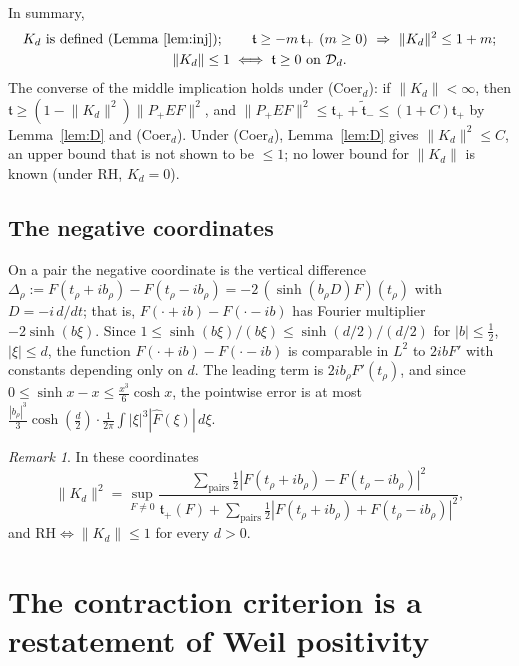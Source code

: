 \documentclass[11pt]{amsart}
\theoremstyle{definition}
\theoremstyle{remark}
\newtheorem{remark}[theorem]{Remark}
\newcommand{\half}{\tfrac12}
\newcommand{\tform}{\mathfrak t}
\newcommand{\tplus}{\mathfrak t_+}
\newcommand{\ttilde}{\widetilde{\mathfrak t}_-}
\newcommand{\Kop}{K}
\newcommand{\Norm}[1]{\lVert #1 \rVert}
\begin{document}
In summary,
\begin{equation}\label{eq:dict}
\begin{gathered}
\Kop_d\ \text{is defined (Lemma~\ref{lem:inj})};\qquad
\tform\ge-m\,\tplus\ (m\ge0)\ \Rightarrow\ \Norm{\Kop_d}^{2}\le1+m;\\
\Norm{\Kop_d}\le1\iff\tform\ge0\ \text{on}\ \mathcal D_d .
\end{gathered}
\end{equation}
The converse of the middle implication holds under (Coer$_d$): if
$\Norm{\Kop_d}<\infty$, then $\tform\ge(1-\Norm{\Kop_d}^{2})\Norm{P_+EF}^{2}$, and
$\Norm{P_+EF}^{2}\le\tplus+\ttilde\le(1+C)\tplus$ by Lemma~\ref{lem:D} and (Coer$_d$).
Under (Coer$_d$), Lemma~\ref{lem:D} gives $\Norm{\Kop_d}^{2}\le C$, an upper bound that
is not shown to be $\le1$; no lower bound for $\Norm{\Kop_d}$ is known (under RH,
$\Kop_d=0$).

\subsection{The negative coordinates}
On a pair the negative coordinate is the vertical difference
$\Delta_\rho:=F(t_\rho+ib_\rho)-F(t_\rho-ib_\rho)=-2\,(\sinh(b_\rho D)F)(t_\rho)$ with
$D=-i\,d/dt$; that is, $F(\cdot+ib)-F(\cdot-ib)$ has Fourier multiplier $-2\sinh(b\xi)$.
Since $1\le\sinh(b\xi)/(b\xi)\le\sinh(d/2)/(d/2)$ for $|b|\le\half$, $|\xi|\le d$, the
function $F(\cdot+ib)-F(\cdot-ib)$ is comparable in $L^{2}$ to $2ibF'$ with constants
depending only on $d$. The leading term is $2ib_\rho F'(t_\rho)$, and since
$0\le\sinh x-x\le\tfrac{x^{3}}6\cosh x$, the pointwise error is at most
$\tfrac{|b_\rho|^{3}}{3}\cosh(\tfrac d2)\cdot\tfrac1{2\pi}\int|\xi|^{3}|\widehat F(\xi)|\,d\xi$.

\begin{remark}
In these coordinates
\begin{equation}\label{eq:rayleigh}
\Norm{\Kop_d}^{2}=\sup_{F\ne0}\frac{\sum_{\text{pairs}}\tfrac12|F(t_\rho+ib_\rho)-F(t_\rho-ib_\rho)|^{2}}
{\tplus(F)+\sum_{\text{pairs}}\tfrac12|F(t_\rho+ib_\rho)+F(t_\rho-ib_\rho)|^{2}},
\end{equation}
and $\mathrm{RH}\iff\Norm{\Kop_d}\le1$ for every $d>0$.
\end{remark}

\section{The contraction criterion is a restatement of Weil positivity}\label{sec:nogo}
\end{document}
